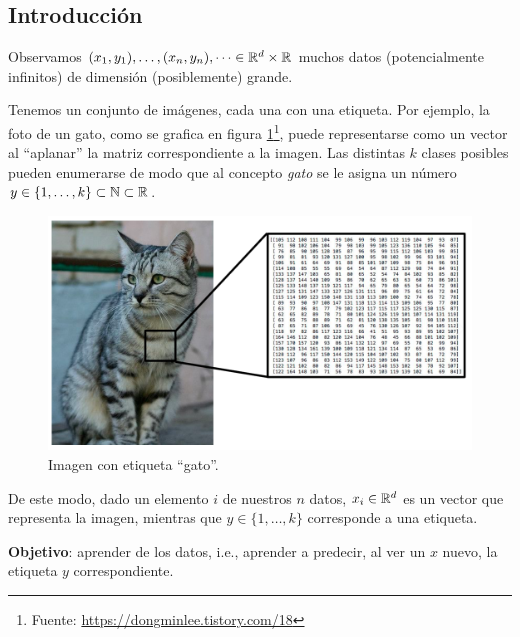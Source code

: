 \subsection{Introducción}
Observamos  $(x_1,y_1),\dots,(x_n,y_n),\dots\in\mathbb{R}^d\times\mathbb{R}$ muchos datos (potencialmente infinitos) de dimensión (posiblemente) grande.
\begin{example}
Tenemos un conjunto de imágenes, cada una con una etiqueta. Por ejemplo, la foto de un gato, como se grafica en figura \ref{fig:gato}\footnote{Fuente: \url{https://dongminlee.tistory.com/18}}, puede representarse como un vector al ``aplanar'' la matriz correspondiente a la imagen. Las distintas $k$ clases posibles pueden enumerarse de modo que al concepto \textit{gato} se le asigna un número $y\in\{1,\dots,k\}\subset\mathbb{N}\subset\mathbb{R}$.
\begin{figure}
    \centering
    \includegraphics[scale=0.32]{img/figura_gato.png}
    \caption{Imagen con etiqueta ``gato''.}
    \label{fig:gato}
\end{figure}
De este modo, dado un elemento $i$ de nuestros $n$ datos, $x_i\in\mathbb{R}^d$ es un vector que representa la imagen, mientras que $y\in\{1,\dots,k\}$ corresponde a una etiqueta.
\end{example}
\newp \textbf{Objetivo}: aprender de los datos, i.e., aprender a predecir, al ver un $x$ nuevo, la etiqueta $y$ correspondiente.
